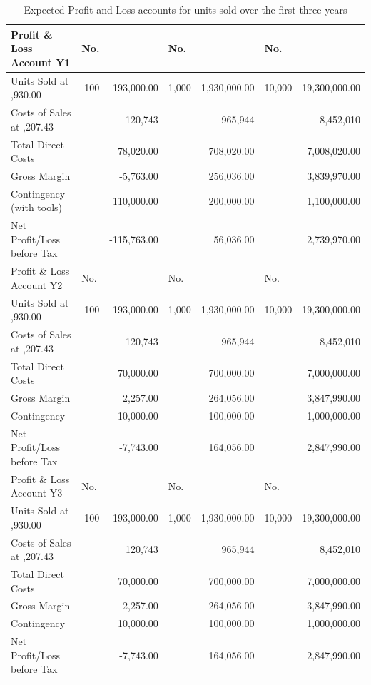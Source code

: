 \documentclass[a4paper,11pt]{article}
\begin{document}
\begin{table}[!ht]
	\centering
	\caption{Expected Profit and Loss accounts for units sold over the first three years}
	\begin{tabular}{l r r r r r r}	
		\hline
		Profit \& Loss Account Y1&\multicolumn{1}{l}{No.}&\multicolumn{1}{l}{\textsterling}&\multicolumn{1}{l}{No.}&\multicolumn{1}{l}{\textsterling}&\multicolumn{1}{l}{No.}&\multicolumn{1}{l}{\textsterling}\\ \hline
		Units Sold at \textsterling 1,930.00&100&193,000.00&1,000&1,930,000.00&10,000&19,300,000.00\\
		Costs of Sales at \textsterling 1,207.43&&120,743&&965,944&&8,452,010\\
		Total Direct Costs&&78,020.00&&708,020.00&&7,008,020.00\\
		Gross Margin&&-5,763.00&&256,036.00&&3,839,970.00\\
		Contingency (with tools)&&110,000.00&&200,000.00&&1,100,000.00\\
		Net Profit/Loss before Tax&&-115,763.00&&56,036.00&&2,739,970.00\\ \hline
		Profit \& Loss Account Y2&\multicolumn{1}{l}{No.}&\multicolumn{1}{l}{\textsterling}&\multicolumn{1}{l}{No.}&\multicolumn{1}{l}{\textsterling}&\multicolumn{1}{l}{No.}&\multicolumn{1}{l}{\textsterling}\\ \hline
		Units Sold at \textsterling 1,930.00&100&193,000.00&1,000&1,930,000.00&10,000&19,300,000.00\\
		Costs of Sales at \textsterling 1,207.43&&120,743&&965,944&&8,452,010\\
		Total Direct Costs&&70,000.00&&700,000.00&&7,000,000.00\\
		Gross Margin&&2,257.00&&264,056.00&&3,847,990.00\\
		Contingency&&10,000.00&&100,000.00&&1,000,000.00\\
		Net Profit/Loss before Tax&&-7,743.00&&164,056.00&&2,847,990.00\\ \hline
		Profit \& Loss Account Y3&\multicolumn{1}{l}{No.}&\multicolumn{1}{l}{\textsterling}&\multicolumn{1}{l}{No.}&\multicolumn{1}{l}{\textsterling}&\multicolumn{1}{l}{No.}&\multicolumn{1}{l}{\textsterling}\\ \hline
		Units Sold at \textsterling 1,930.00&100&193,000.00&1,000&1,930,000.00&10,000&19,300,000.00\\
		Costs of Sales at \textsterling 1,207.43&&120,743&&965,944&&8,452,010\\
		Total Direct Costs&&70,000.00&&700,000.00&&7,000,000.00\\
		Gross Margin&&2,257.00&&264,056.00&&3,847,990.00\\
		Contingency&&10,000.00&&100,000.00&&1,000,000.00\\
		Net Profit/Loss before Tax&&-7,743.00&&164,056.00&&2,847,990.00\\
	\end{tabular}
	\label{tab:PLA}
\end{table}
\end{document}
